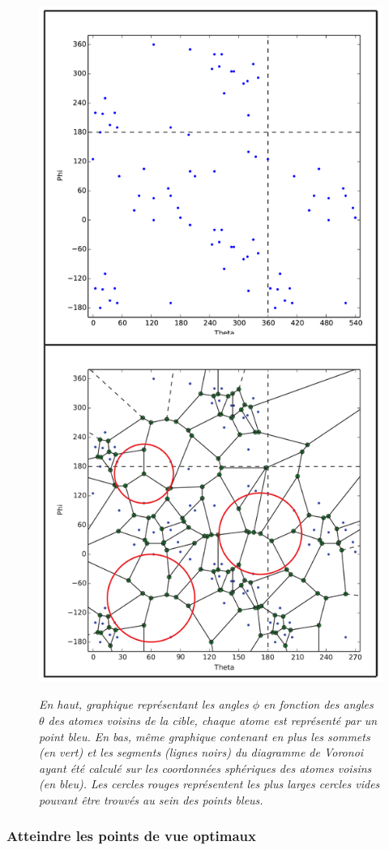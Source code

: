\begin{figure}[h]
  \centering
  {\includegraphics[width=.5\linewidth]{./figures/ch3/voronoi_diagram}}
    \caption{{\it En haut, graphique représentant les angles $\phi$ en fonction des angles $\theta$ des atomes voisins de la cible, chaque atome est représenté par un point bleu. En bas, même graphique contenant en plus les sommets (en vert) et les segments (lignes noirs) du diagramme de Voronoi ayant été calculé sur les coordonnées sphériques des atomes voisins (en bleu). Les cercles rouges représentent les plus larges cercles vides pouvant être trouvés au sein des points bleus.}}
  \label{Fig:voronoi_diagram}
  \hspace{0.2cm}
\end{figure}

\subsubsection{Atteindre les points de vue optimaux}

